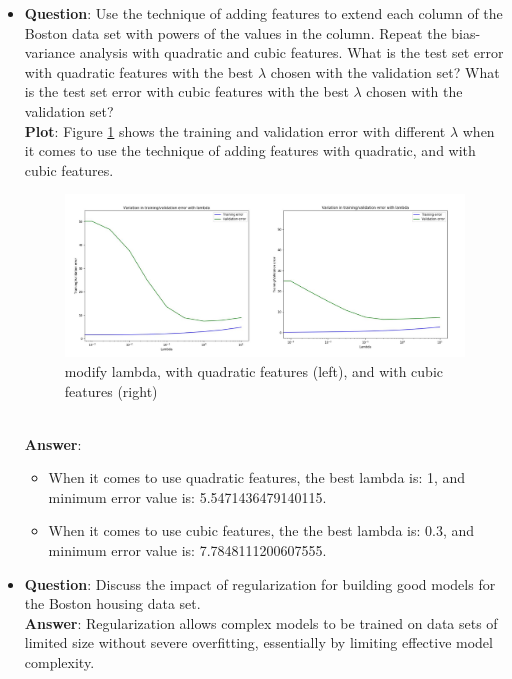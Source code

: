 \documentclass[paper=a4, fontsize=11pt]{scrartcl} %
\numberwithin{equation}{section} %
\numberwithin{figure}{section} %
\numberwithin{table}{section} %
\begin{document}
\begin{itemize}
     \item
        \textbf{Question}:  Use the technique of adding features to extend each column of the Boston data set with powers of the values in the column. Repeat the bias-variance analysis with quadratic and cubic features. What is the test set error with quadratic features with the best $\lambda$ chosen with the validation set? What is the test set error with cubic features with the best $\lambda$ chosen with the validation set?
    \\ \textbf{Plot}:
        Figure \ref{fig:extraCredit2} shows the training and validation error with different $\lambda$ when it comes to use the technique of adding features with quadratic, and with cubic features.
        \begin{figure}
     		\centering
     		\includegraphics[scale=0.25]{Comparation5.jpg}
     		\caption{modify lambda, with quadratic features (left), and with cubic features (right)}
     		\label{fig:extraCredit2}
     	\end{figure}
     \\ \textbf{Answer}:
        \begin{itemize}
            \item When it comes to use quadratic features, the best lambda is: 1, and minimum error value is: 5.5471436479140115.
            \item When it comes to use cubic features, the the best lambda is: 0.3, and minimum error value is: 7.7848111200607555.
        \end{itemize}

     \item
        \textbf{Question}: Discuss the impact of regularization for building good models for the Boston housing data set.
        \\ \textbf{Answer}: Regularization allows complex models to be trained on data sets of limited size without severe overfitting, essentially by limiting effective model complexity.
\end{itemize}
\end{document}
